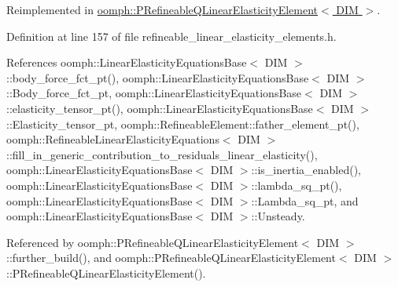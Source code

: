 Reimplemented in \hyperlink{classoomph_1_1PRefineableQLinearElasticityElement_a286182e34bade0d256482bed74e8e77f}{oomph\+::\+P\+Refineable\+Q\+Linear\+Elasticity\+Element$<$ D\+I\+M $>$}.



Definition at line 157 of file refineable\+\_\+linear\+\_\+elasticity\+\_\+elements.\+h.



References oomph\+::\+Linear\+Elasticity\+Equations\+Base$<$ D\+I\+M $>$\+::body\+\_\+force\+\_\+fct\+\_\+pt(), oomph\+::\+Linear\+Elasticity\+Equations\+Base$<$ D\+I\+M $>$\+::\+Body\+\_\+force\+\_\+fct\+\_\+pt, oomph\+::\+Linear\+Elasticity\+Equations\+Base$<$ D\+I\+M $>$\+::elasticity\+\_\+tensor\+\_\+pt(), oomph\+::\+Linear\+Elasticity\+Equations\+Base$<$ D\+I\+M $>$\+::\+Elasticity\+\_\+tensor\+\_\+pt, oomph\+::\+Refineable\+Element\+::father\+\_\+element\+\_\+pt(), oomph\+::\+Refineable\+Linear\+Elasticity\+Equations$<$ D\+I\+M $>$\+::fill\+\_\+in\+\_\+generic\+\_\+contribution\+\_\+to\+\_\+residuals\+\_\+linear\+\_\+elasticity(), oomph\+::\+Linear\+Elasticity\+Equations\+Base$<$ D\+I\+M $>$\+::is\+\_\+inertia\+\_\+enabled(), oomph\+::\+Linear\+Elasticity\+Equations\+Base$<$ D\+I\+M $>$\+::lambda\+\_\+sq\+\_\+pt(), oomph\+::\+Linear\+Elasticity\+Equations\+Base$<$ D\+I\+M $>$\+::\+Lambda\+\_\+sq\+\_\+pt, and oomph\+::\+Linear\+Elasticity\+Equations\+Base$<$ D\+I\+M $>$\+::\+Unsteady.



Referenced by oomph\+::\+P\+Refineable\+Q\+Linear\+Elasticity\+Element$<$ D\+I\+M $>$\+::further\+\_\+build(), and oomph\+::\+P\+Refineable\+Q\+Linear\+Elasticity\+Element$<$ D\+I\+M $>$\+::\+P\+Refineable\+Q\+Linear\+Elasticity\+Element().

\mbox{\label{classoomph_1_1RefineableLinearElasticityEquations_ac048280ba30d323e92e42457f20163e4}} 
